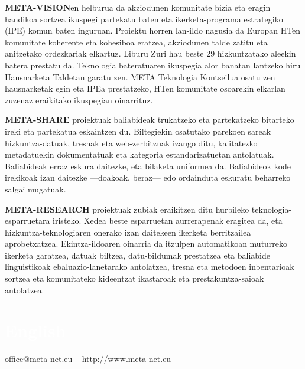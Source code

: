 \begin{multicols}{2}
\textbf{META-VISION}en helburua da akziodunen komunitate bizia eta eragin handikoa sortzea ikuspegi partekatu baten eta ikerketa-programa estrategiko (IPE) komun baten inguruan. Proiektu horren lan-ildo nagusia da Europan HTen komunitate koherente eta kohesiboa eratzea, akziodunen talde zatitu eta anitzetako ordezkariak elkartuz. Liburu Zuri hau beste 29 hizkuntzatako aleekin batera prestatu da. Teknologia bateratuaren ikuspegia alor banatan lantzeko hiru Hausnarketa Taldetan garatu zen. META Teknologia Kontseilua osatu zen hausnarketak egin eta IPEa prestatzeko, HTen komunitate osoarekin elkarlan zuzenaz eraikitako ikuspegian oinarrituz.

\textbf{META-SHARE} proiektuak baliabideak trukatzeko eta partekatzeko bitarteko ireki eta partekatua eskaintzen du. Biltegiekin osatutako parekoen sareak hizkuntza-datuak, tresnak eta web-zerbitzuak izango ditu, kalitatezko metadatuekin dokumentatuak eta kategoria estandarizatuetan antolatuak. Baliabideak erraz eskura daitezke, eta bilaketa uniformea da. Baliabideok kode irekikoak izan daitezke —doakoak, beraz— edo ordainduta eskuratu beharreko salgai mugatuak. 

 \textbf{META-RESEARCH} proiektuak zubiak eraikitzen ditu hurbileko teknologia-esparruetara iristeko. Xedea beste esparruetan aurrerapenak eragitea da, eta hizkuntza-teknologiaren onerako izan daitekeen ikerketa berritzailea aprobetxatzea. Ekintza-ildoaren oinarria da itzulpen automatikoan muturreko ikerketa garatzea, datuak biltzea, datu-bildumak prestatzea eta baliabide linguistikoak ebaluazio-lanetarako antolatzea, tresna eta metodoen inbentarioak sortzea eta komunitateko kideentzat ikastaroak eta prestakuntza-saioak antolatzea.
\end{multicols}

\vfill

\makeatletter
{}
{
  \renewcommand*{\theHsection}{\thepart.\thesection}
}
\makeatother
\part*{\textcolor{white}{English}}
\setcounter{section}{0}
\setcounter{figure}{0}

\centerline{office@meta-net.eu -- http://www.meta-net.eu}


